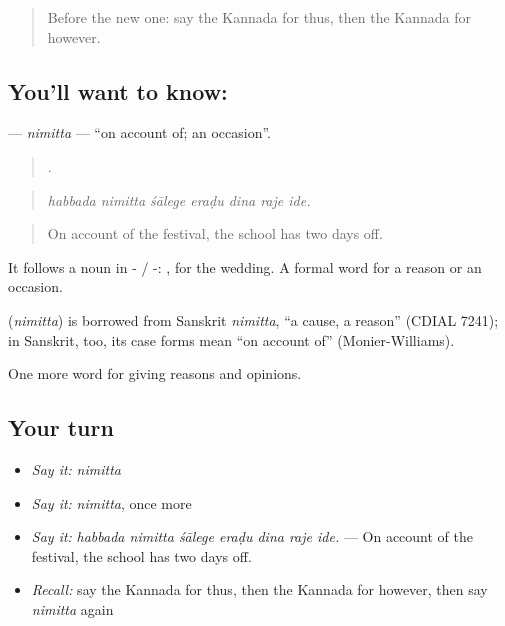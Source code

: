 \label{lesson:KA-C410-nimitta}



\begin{quote}
Before the new one: say the Kannada for thus, then the Kannada for however.
\end{quote}

\subsection*{You'll want to know: }
\textbf{} — \emph{nimitta} — \textquotedblleft{}on account of; an occasion\textquotedblright{}.

\begin{quote}
      .
\end{quote}

\begin{quote}
\emph{habbada nimitta śālege eraḍu dina raje ide.}
\end{quote}

\begin{quote}
On account of the festival, the school has two days off.
\end{quote}

It follows a noun in - / -:  , for the wedding. A formal word for a reason or an occasion.

\begin{cousinweb}
\textbf{} (\emph{nimitta}) is borrowed from Sanskrit \emph{nimitta}, \textquotedblleft{}a cause, a reason\textquotedblright{} (CDIAL 7241); in Sanskrit, too, its case forms mean \textquotedblleft{}on account of\textquotedblright{} (Monier-Williams).
\end{cousinweb}

\begin{grammarlens}[title={What you've built}]
One more word for giving reasons and opinions.
\end{grammarlens}

\subsection*{Your turn}
\begin{itemize}
\raggedright
  \item \emph{Say it:} \emph{nimitta}
  \item \emph{Say it:} \emph{nimitta}, once more
  \item \emph{Say it:} \emph{habbada nimitta śālege eraḍu dina raje ide.} — On account of the festival, the school has two days off.
  \item \emph{Recall:} say the Kannada for thus, then the Kannada for however, then say \emph{nimitta} again
\end{itemize}

